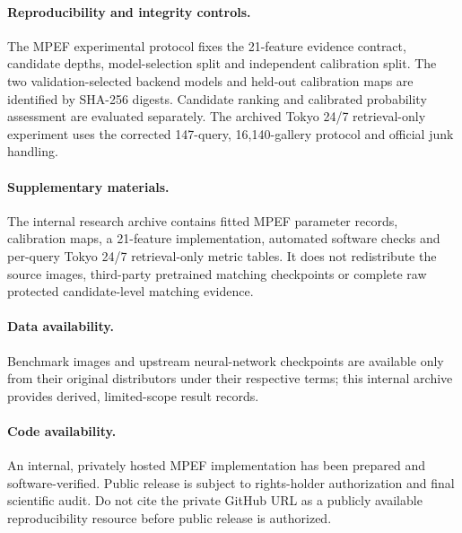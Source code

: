\paragraph{Reproducibility and integrity controls.}
The MPEF experimental protocol fixes the 21-feature evidence contract, candidate
depths, model-selection split and independent calibration split. The two
validation-selected backend models and held-out calibration maps are identified
by SHA-256 digests. Candidate ranking and calibrated probability assessment
are evaluated separately. The archived Tokyo 24/7 retrieval-only experiment
uses the corrected 147-query, 16,140-gallery protocol and official junk handling.

\paragraph{Supplementary materials.}
The internal research archive contains fitted MPEF parameter records, calibration
maps, a 21-feature implementation, automated software checks and per-query
Tokyo 24/7 retrieval-only metric tables. It does not redistribute the source
images, third-party pretrained matching checkpoints or complete raw protected
candidate-level matching evidence.

\paragraph{Data availability.}
Benchmark images and upstream neural-network checkpoints are available only
from their original distributors under their respective terms; this internal
archive provides derived, limited-scope result records.

\paragraph{Code availability.}
An internal, privately hosted MPEF implementation has been prepared and
software-verified. Public release is subject to rights-holder authorization
and final scientific audit. Do not cite the private GitHub URL as a publicly
available reproducibility resource before public release is authorized.
